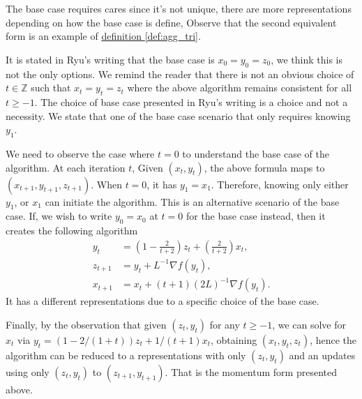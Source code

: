 \documentclass[12pt]{article}
\begin{document}
            \begin{observation}
                The base case requires cares since it's not unique, there are more representations  depending on how the base case is define, 
                Observe that the second equivalent form is an example of \hyperref[def:agg_tri]{definition \ref*{def:agg_tri}}. 
                \par\noindent
                It is stated in Ryu's writing that the base case is $x_0 = y_0 = z_0$, 
                we think this is not the only options. 
                We remind the reader that there is not an obvious choice of $t\in \mathbb Z$ such that $x_t = y_t = z_t$ where the above algorithm remains consistent for all $t \ge -1$. 
                The choice of base case presented in Ryu's writing is a choice and not a necessity. 
                We state that one of the base case scenario that only requires knowing $y_1$. 
    
                \par\noindent 
                We need to observe the case where $t = 0$ to understand the base case of the algorithm. 
                At each iteration $t$, Given $(x_t, y_t)$, the above formula maps to $(x_{t + 1}, y_{t + 1}, z_{t + 1})$. 
                When $t= 0$, it has $y_1 = x_1$. 
                Therefore, knowing only either $y_1$, or $x_1$ can initiate the algorithm. 
                This is an alternative scenario of the base case. 
                If, we wish to write $y_0 = x_0$ at $t = 0$ for the base case instead, then it creates the following algorithm 
                \begin{align*}
                    y_{t} &= \left(
                    1 - \frac{2}{t + 2} 
                    \right)z_{t} + 
                    \left(
                        \frac{2}{t + 2}
                    \right)x_{t}, 
                    \\
                    z_{t + 1} &= y_t + L^{-1}\nabla f(y_t), 
                    \\
                    x_{t + 1} &= x_t + (t + 1)(2L)^{-1}\nabla f(y_t). 
                \end{align*}
                It has a different representations due to a specific choice of the base case. 
                \par\noindent
                Finally, by the observation that given $(z_t, y_t)$ for any $t\ge -1$, we can solve for $x_t$ \newline via $y_t = (1 - 2/(1 + t))z_t + 1/(t + 1)x_t$, obtaining $(x_t, y_t, z_t)$, hence the algorithm can be reduced to a representations with only $(z_t, y_t)$ and an updates using only $(z_t, y_t)$ to $(z_{t + 1}, y_{t + 1})$. 
                That is the momentum form presented above. 
            \end{observation}
\end{document}
